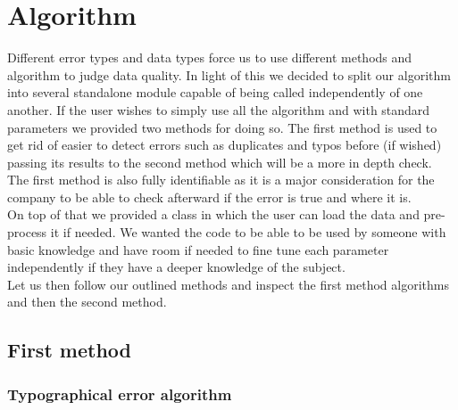 \documentclass{article}
\begin{document}

\section{Algorithm} %
\label{sec:Algorithm}
Different error types and data types force us to use different methods and algorithm to judge data quality. In light of this we decided to split our algorithm into several standalone module capable of being called independently of one another.
If the user wishes to simply use all the algorithm and with standard parameters we provided two methods for doing so. The first method is used to get rid of easier to detect errors such as duplicates and typos before (if wished) passing its results to the second method which will be a more in depth check. The first method is also fully identifiable as it is a major consideration for the company to be able to check afterward if the error is true and where it is.\\
On top of that we provided a class in which the user can load the data and pre-process it if needed. We wanted the code to be able to be used by someone with basic knowledge and have room if needed to fine tune each parameter independently if they have a deeper knowledge of the subject.\\
Let us then follow our outlined methods and inspect the first method algorithms and then the second method.


\subsection{First method}

\subsubsection{Typographical error algorithm}
\end{document}
